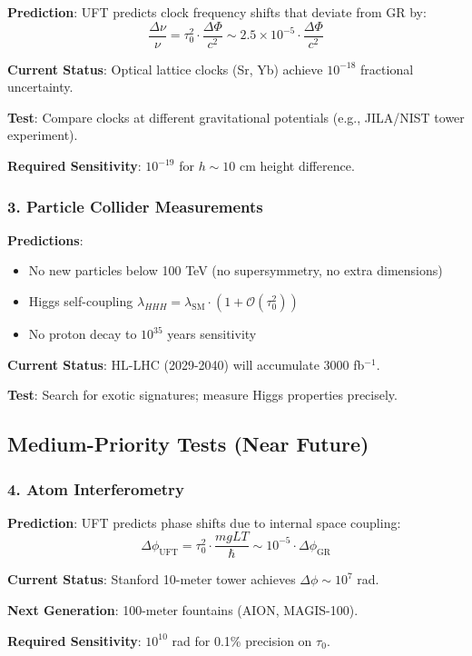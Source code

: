 \begin{test}
\textbf{Prediction}: UFT predicts clock frequency shifts that deviate from GR by:
\begin{equation}
    \frac{\Delta \nu}{\nu} = \tau_0^2 \cdot \frac{\Delta \Phi}{c^2} \sim 2.5 \times 10^{-5} \cdot \frac{\Delta \Phi}{c^2}
\end{equation}

\textbf{Current Status}: Optical lattice clocks (Sr, Yb) achieve $10^{-18}$ fractional uncertainty.

\textbf{Test}: Compare clocks at different gravitational potentials (e.g., JILA/NIST tower experiment).

\textbf{Required Sensitivity}: $10^{-19}$ for $h \sim 10$ cm height difference.
\end{test}

\subsubsection{3. Particle Collider Measurements}

\begin{test}
\textbf{Predictions}:
\begin{itemize}
    \item No new particles below 100 TeV (no supersymmetry, no extra dimensions)
    \item Higgs self-coupling $\lambda_{HHH} = \lambda_{\text{SM}} \cdot (1 + \mathcal{O}(\tau_0^2))$
    \item No proton decay to $10^{35}$ years sensitivity
\end{itemize}

\textbf{Current Status}: HL-LHC (2029-2040) will accumulate 3000 fb$^{-1}$.

\textbf{Test}: Search for exotic signatures; measure Higgs properties precisely.
\end{test}

\subsection{Medium-Priority Tests (Near Future)}

\subsubsection{4. Atom Interferometry}

\begin{test}
\textbf{Prediction}: UFT predicts phase shifts due to internal space coupling:
\begin{equation}
    \Delta \phi_{\text{UFT}} = \tau_0^2 \cdot \frac{m g L T}{\hbar} \sim 10^{-5} \cdot \Delta \phi_{\text{GR}}
\end{equation}

\textbf{Current Status}: Stanford 10-meter tower achieves $\Delta\phi \sim 10^7$ rad.

\textbf{Next Generation}: 100-meter fountains (AION, MAGIS-100).

\textbf{Required Sensitivity}: $10^{10}$ rad for 0.1\% precision on $\tau_0$.
\end{test}

